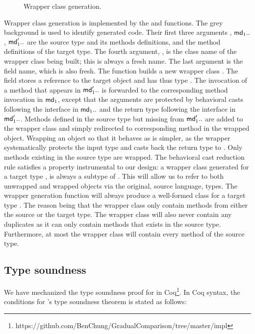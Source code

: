 \documentclass[a4paper,USenglish]{tex/lipics-v2016}
\begin{document}
\begin{figure}[!h]
\vspace{-5mm}

\hrulefill
\vspace{-2mm}
\caption{Wrapper class generation.}\label{w}\end{figure}


Wrapper class generation is implemented by the  and 
functions. The grey background is used to identify generated code.
Their first three arguments \C, \(\md[1]..\), \(\mdp[1]..\) are
the source type and its methods definitions, and the method definitions of
the target type. The fourth argument, \D, is the class name of the wrapper
class being built; this is always a fresh name. The last argument is the
\that field name, which is also fresh.  The function builds a new wrapper
class \D.  The field \that stores a reference to the target object and has
thus type \C.  The invocation of a method that appears in $\mdp[1]..$ is
forwarded to the corresponding method invocation in $\md[1]$, except that
the arguments are protected by behavioral casts following the interface in
$\md[1]..$ and the return type following the interface in $\mdp[1]..$.
Methods defined in the source type but missing from $\mdp[1]..$ are added to
the wrapper class and simply redirected to corresponding method in the
wrapped object.  Wrapping an object so that it behaves as \any is simpler,
as the wrapper systematically protects the input type and casts back the
return type to \any. Only methods existing in the source type are
wrapped. The behavioral cast reduction rule satisfies a property
instrumental to our design: a wrapper class generated for a target type \D,
is always a subtype of \D.  This will allow us to refer to both unwrapped
and wrapped objects via the original, source language, types. The wrapper
generation function will always produce a well-formed class for a target
type \D. The reason being that the wrapper class only contain methods from
either the source or the target type. The wrapper class will also never
contain any duplicates as it can only contain methods that exists in the
source type.  Furthermore, at most the wrapper class will contain every
method of the source type.

\subsection{Type soundness} 
We have mechanized the type soundness proof for \kafka in
Coq\footnote{https://github.com/BenChung/GradualComparison/tree/master/impl}. In
Coq syntax, the conditions for \kafka's type soundness theorem is stated as
follows:
\end{document}
